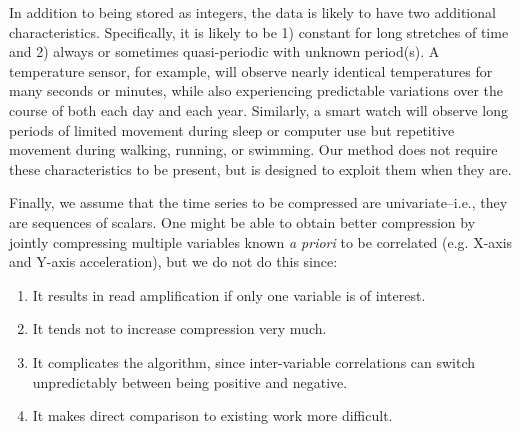 In addition to being stored as integers, the data is likely to have two additional characteristics. Specifically, it is likely to be 1) constant for long stretches of time and 2) always or sometimes quasi-periodic with unknown period(s). A temperature sensor, for example, will observe nearly identical temperatures for many seconds or minutes, while also experiencing predictable variations over the course of both each day and each year. Similarly, a smart watch will observe long periods of limited movement during sleep or computer use but repetitive movement during walking, running, or swimming. Our method does not require these characteristics to be present, but is designed to exploit them when they are.

Finally, we assume that the time series to be compressed are univariate--i.e., they are sequences of scalars. One might be able to obtain better compression by jointly compressing multiple variables known \textit{a priori} to be correlated (e.g. X-axis and Y-axis acceleration), but we do not do this since:

\begin{enumerate}[leftmargin=4mm]
\item It results in read amplification if only one variable is of interest.
\item It tends not to increase compression very much.
\item It complicates the algorithm, since inter-variable correlations can switch unpredictably between being positive and negative.
\item It makes direct comparison to existing work more difficult.
\end{enumerate}




